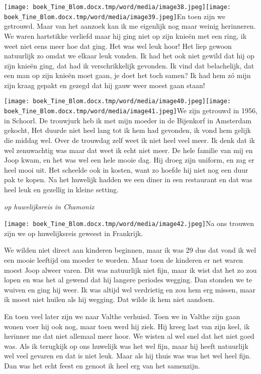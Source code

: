 \documentclass{scrbook}
\begin{document}
{\texttt{[image: boek\_Tine\_Blom.docx.tmp/word/media/image38.jpeg]}\texttt{[image: boek\_Tine\_Blom.docx.tmp/word/media/image39.jpeg]}En toen zijn we getrouwd. Maar van het aanzoek kan ik me eigenlijk nog maar weinig herinneren. We waren hartstikke verliefd maar hij ging niet op zijn knie\"{e}n met een ring, ik weet niet eens meer hoe dat ging. Het was wel leuk hoor! Het liep gewoon natuurlijk zo omdat we elkaar leuk vonden. Ik had het ook niet gewild dat hij op zijn knie\"{e}n ging, dat had ik verschrikkelijk gevonden. Ik vind dat belachelijk, dat een man op zijn knie\"{e}n moet gaan, je doet het toch samen? Ik had hem z\'{o} mijn zijn kraag gepakt en gezegd dat hij gauw weer moest gaan staan!

\texttt{[image: boek\_Tine\_Blom.docx.tmp/word/media/image40.jpeg]}\texttt{[image: boek\_Tine\_Blom.docx.tmp/word/media/image41.jpeg]}We zijn getrouwd in 1956, in Schoorl. De trouwjurk heb ik met mijn moeder in de Bijenkorf in Amsterdam gekocht, Het duurde niet heel lang tot ik hem had gevonden, ik vond hem gelijk die middag wel. Over de trouwdag zelf weet ik niet heel veel meer. Ik denk dat ik wel zenuwachtig was maar dat weet ik echt niet meer. De hele familie van mij en Joop kwam, en het was wel een hele mooie dag. Hij droeg zijn uniform, en zag er heel mooi uit. Het scheelde ook in kosten, want zo hoefde hij niet nog een duur pak te kopen. Na het huwelijk hadden we een diner in een restaurant en dat was heel leuk en gezellig in kleine setting.

\textit{op huwelijksreis in Chamonix }



 \texttt{[image: boek\_Tine\_Blom.docx.tmp/word/media/image42.jpeg]}Na ons trouwen zijn we op huwelijksreis geweest in Frankrijk.

We wilden niet direct aan kinderen beginnen, maar ik was 29 dus dat vond ik wel een mooie leeftijd om moeder te worden. Maar toen de kinderen er net waren moest Joop alweer varen. Dit was natuurlijk niet fijn, maar ik wist dat het zo zou lopen en was het al gewend dat hij langere periodes wegging. Dan stonden we te wuiven en ging hij weer. Ik was altijd wel verdrietig en zou hem erg missen, maar ik moest niet huilen als hij wegging. Dat wilde ik hem niet aandoen. 

En toen veel later zijn we naar Valthe verhuisd. Toen we in Valthe zijn gaan wonen voer hij ook nog, maar toen werd hij ziek. Hij kreeg last van zijn keel, ik herinner me dat niet allemaal meer hoor. We wisten al wel snel dat het niet goed was. Als ik terugkijk op ons huwelijk was het wel fijn, maar hij heeft natuurlijk wel veel gevaren en dat is niet leuk. Maar als hij thuis was was het wel heel fijn. Dan was het echt feest en genoot ik heel erg van het samenzijn.

}
\end{document}
